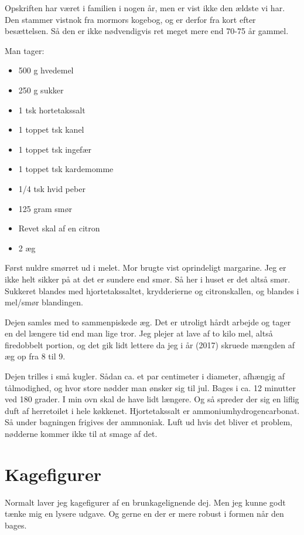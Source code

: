 \documentclass[
  letterpaper,
  DIV=11,
  numbers=noendperiod]{scrreprt}
\providecommand{\tightlist}{%
  \setlength{\itemsep}{0pt}\setlength{\parskip}{0pt}}\usepackage{longtable,booktabs,array}
\begin{document}
Opskriften har været i familien i nogen år, men er vist ikke den ældste
vi har. Den stammer vistnok fra mormors kogebog, og er derfor fra kort
efter besættelsen. Så den er ikke nødvendigvis ret meget mere end 70-75
år gammel.

Man tager:

\begin{itemize}
\tightlist
\item
  500 g hvedemel
\item
  250 g sukker
\item
  1 tsk hortetakssalt
\item
  1 toppet tsk kanel
\item
  1 toppet tsk ingefær
\item
  1 toppet tsk kardemomme
\item
  1/4 tsk hvid peber
\item
  125 gram smør
\item
  Revet skal af en citron
\item
  2 æg
\end{itemize}

Først nuldre smørret ud i melet. Mor brugte vist oprindeligt margarine.
Jeg er ikke helt sikker på at det er sundere end smør. Så her i huset er
det altså smør. Sukkeret blandes med hjortetakssaltet, krydderierne og
citronskallen, og blandes i mel/smør blandingen.

Dejen samles med to sammenpiskede æg. Det er utroligt hårdt arbejde og
tager en del længere tid end man lige tror. Jeg plejer at lave af to
kilo mel, altså firedobbelt portion, og det gik lidt lettere da jeg i år
(2017) skruede mængden af æg op fra 8 til 9.

Dejen trilles i små kugler. Sådan ca. et par centimeter i diameter,
afhængig af tålmodighed, og hvor store nødder man ønsker sig til jul.
Bages i ca. 12 minutter ved 180 grader. I min ovn skal de have lidt
længere. Og så spreder der sig en liflig duft af herretoilet i hele
køkkenet. Hjortetakssalt er ammoniumhydrogencarbonat. Så under bagningen
frigives der ammnoniak. Luft ud hvis det bliver et problem, nødderne
kommer ikke til at smage af det.

\hypertarget{kagefigurer}{%
\section{Kagefigurer}\label{kagefigurer}}

Normalt laver jeg kagefigurer af en brunkagelignende dej. Men jeg kunne
godt tænke mig en lysere udgave. Og gerne en der er mere robust i formen
når den bages.
\end{document}
